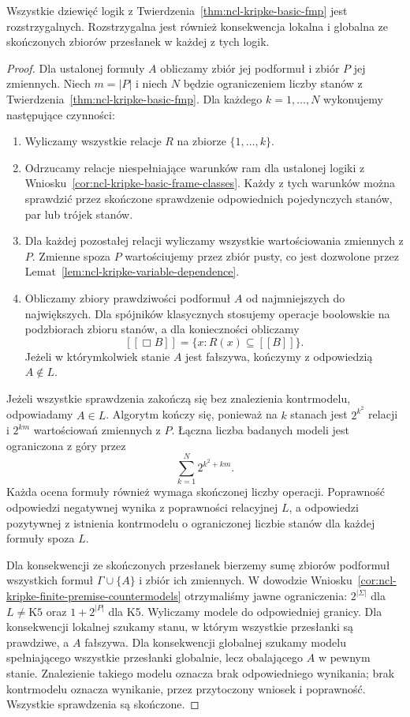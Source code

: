\begin{twierdzenie}
\label{thm:ncl-kripke-basic-decidability}
Wszystkie dziewięć logik z
Twierdzenia~\ref{thm:ncl-kripke-basic-fmp}
jest rozstrzygalnych. Rozstrzygalna jest
również konsekwencja lokalna i globalna
ze skończonych zbiorów przesłanek
w każdej z tych logik.
\end{twierdzenie}
\begin{proof}
Dla ustalonej formuły $A$ obliczamy zbiór
jej podformuł i zbiór $P$ jej zmiennych.
Niech $m=|P|$ i niech $N$ będzie ograniczeniem
liczby stanów z
Twierdzenia~\ref{thm:ncl-kripke-basic-fmp}.
Dla każdego $k=1,\ldots,N$ wykonujemy
następujące czynności:
\begin{enumerate}
 \item Wyliczamy wszystkie relacje $R$ na
 zbiorze $\{1,\ldots,k\}$.
 \item Odrzucamy relacje niespełniające
 warunków ram dla ustalonej logiki z
 Wniosku~\ref{cor:ncl-kripke-basic-frame-classes}.
 Każdy z tych warunków można sprawdzić
 przez skończone sprawdzenie odpowiednich
 pojedynczych stanów, par lub trójek stanów.
 \item Dla każdej pozostałej relacji wyliczamy
 wszystkie wartościowania zmiennych z $P$.
 Zmienne spoza $P$ wartościujemy przez
 zbiór pusty, co jest dozwolone przez
 Lemat~\ref{lem:ncl-kripke-variable-dependence}.
 \item Obliczamy zbiory prawdziwości podformuł
 $A$ od najmniejszych do największych.
 Dla spójników klasycznych stosujemy operacje
 boolowskie na podzbiorach zbioru stanów,
 a dla konieczności obliczamy
 \[
 [\![\Box B]\!]=\{x:R(x)\subseteq[\![B]\!]\}.
 \]
 Jeżeli w którymkolwiek stanie $A$ jest
 fałszywa, kończymy z odpowiedzią $A\notin L$.
\end{enumerate}
Jeżeli wszystkie sprawdzenia zakończą się
bez znalezienia kontrmodelu, odpowiadamy $A\in L$.
Algorytm kończy się, ponieważ na $k$ stanach
jest $2^{k^2}$ relacji i $2^{km}$ wartościowań
zmiennych z $P$. Łączna liczba badanych
modeli jest ograniczona z góry przez
\[
 \sum_{k=1}^{N}2^{k^2+km}.
\]
Każda ocena formuły również wymaga
skończonej liczby operacji.
Poprawność odpowiedzi negatywnej wynika
z poprawności relacyjnej $L$, a odpowiedzi
pozytywnej z istnienia kontrmodelu o
ograniczonej liczbie stanów dla każdej
formuły spoza $L$.

Dla konsekwencji ze skończonych przesłanek
bierzemy sumę zbiorów podformuł wszystkich
formuł $\Gamma\cup\{A\}$ i zbiór ich zmiennych.
W dowodzie
Wniosku~\ref{cor:ncl-kripke-finite-premise-countermodels}
otrzymaliśmy jawne ograniczenia: $2^{|\Sigma|}$
dla $L\ne\mathrm{K5}$ oraz $1+2^{|P|}$ dla K5.
Wyliczamy modele do odpowiedniej granicy.
Dla konsekwencji lokalnej szukamy stanu,
w którym wszystkie przesłanki są prawdziwe,
a $A$ fałszywa. Dla konsekwencji globalnej
szukamy modelu spełniającego wszystkie
przesłanki globalnie, lecz obalającego $A$
w pewnym stanie.
Znalezienie takiego modelu oznacza brak
odpowiedniego wynikania; brak kontrmodelu
oznacza wynikanie, przez przytoczony wniosek
i poprawność. Wszystkie sprawdzenia są skończone.
\end{proof}

